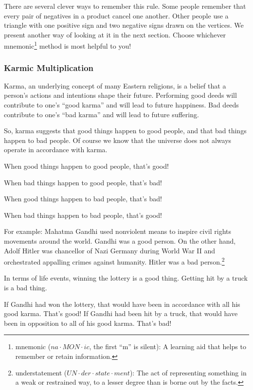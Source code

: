 There are several clever ways to remember this rule. Some people remember that every pair of negatives in a product cancel one another. Other people use a triangle with one positive sign and two negative signs drawn on the vertices. We present another way of looking at it in the next section. Choose whichever mnemonic\footnote{mnemonic ($na \cdot MON \cdot ic$, the first ``m'' is silent): A learning aid that helps to remember or retain information.} method is most helpful to you!

\subsubsection{Karmic Multiplication}

Karma, an underlying concept of many Eastern religions, is a belief that a person's actions and intentions shape their future. Performing good deeds will contribute to one's ``good karma'' and will lead to future happiness. Bad deeds contribute to one's ``bad karma'' and will lead to future suffering.

So, karma suggests that good things happen to good people, and that bad things happen to bad people. Of course we know that the universe does not always operate in accordance with karma.

\begin{boxeddef}
\centering
When good things happen to good people, that's good!

When bad things happen to good people, that's bad!

When good things happen to bad people, that's bad!

When bad things happen to bad people, that's good!
\end{boxeddef}

For example: Mahatma Gandhi used nonviolent means to inspire civil rights movements around the world. Gandhi was a good person. On the other hand, Adolf Hitler was chancellor of Nazi Germany during World War II and orchestrated appalling crimes against humanity. Hitler was a bad person.\footnote{understatement ($UN \cdot der \cdot state \cdot ment$): The act of representing something in a weak or restrained way, to a lesser degree than is borne out by the facts.}

In terms of life events, winning the lottery is a good thing. Getting hit by a truck is a bad thing.

If Gandhi had won the lottery, that would have been in accordance with all his good karma. That's good! If Gandhi had been hit by a truck, that would have been in opposition to all of his good karma. That's bad!


